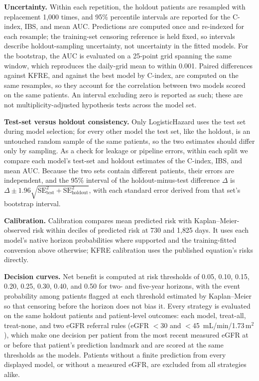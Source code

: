 \textbf{Uncertainty.} Within each repetition, the holdout patients are resampled with replacement 1{,}000 times, and 95\% percentile intervals are reported for the C-index, IBS, and mean AUC. Predictions are computed once and re-indexed for each resample; the training-set censoring reference is held fixed, so intervals describe holdout-sampling uncertainty, not uncertainty in the fitted models. For the bootstrap, the AUC is evaluated on a 25-point grid spanning the same window, which reproduces the daily-grid mean to within 0.001. Paired differences against KFRE, and against the best model by C-index, are computed on the same resamples, so they account for the correlation between two models scored on the same patients. An interval excluding zero is reported as such; these are not multiplicity-adjusted hypothesis tests across the model set.

\textbf{Test-set versus holdout consistency.} Only LogisticHazard uses the test set during model selection; for every other model the test set, like the holdout, is an untouched random sample of the same patients, so the two estimates should differ only by sampling. As a check for leakage or pipeline errors, within each split we compare each model's test-set and holdout estimates of the C-index, IBS, and mean AUC. Because the two sets contain different patients, their errors are independent, and the 95\% interval of the holdout-minus-test difference $\Delta$ is $\Delta \pm 1.96\sqrt{\mathrm{SE}_{\mathrm{test}}^2+\mathrm{SE}_{\mathrm{holdout}}^2}$, with each standard error derived from that set's bootstrap interval.

\textbf{Calibration.} Calibration compares mean predicted risk with Kaplan--Meier-observed risk within deciles of predicted risk at 730 and 1{,}825 days. It uses each model's native horizon probabilities where supported and the training-fitted conversion above otherwise; KFRE calibration uses the published equation's risks directly.

\textbf{Decision curves.} Net benefit \citep{vickers2006decisioncurve} is computed at risk thresholds of 0.05, 0.10, 0.15, 0.20, 0.25, 0.30, 0.40, and 0.50 for two- and five-year horizons, with the event probability among patients flagged at each threshold estimated by Kaplan--Meier so that censoring before the horizon does not bias it. Every strategy is evaluated on the same holdout patients and patient-level outcomes: each model, treat-all, treat-none, and two eGFR referral rules (eGFR $<$30 and $<$45~mL/min/1.73\,m$^2$), which make one decision per patient from the most recent measured eGFR at or before that patient's prediction landmark and are scored at the same thresholds as the models. Patients without a finite prediction from every displayed model, or without a measured eGFR, are excluded from all strategies alike.

